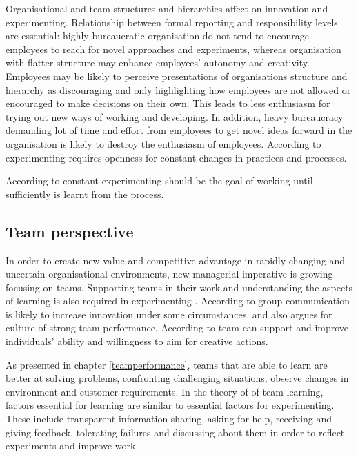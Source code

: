 Organisational and team structures and hierarchies affect on innovation and experimenting. Relationship between formal reporting and responsibility levels are essential: highly bureaucratic organisation do not tend to encourage employees to reach for novel approaches and experiments, whereas organisation with flatter structure may enhance employees' autonomy and creativity. Employees may be likely to perceive presentations of organisations structure and hierarchy as discouraging and only highlighting how employees are not allowed or encouraged to make decisions on their own. This leads to less enthusiasm for trying out new ways of working and developing. In addition, heavy bureaucracy demanding lot of time and effort from employees to get novel ideas forward in the organisation is likely to destroy the enthusiasm of employees. \citep{shalley2004leaders} According to \citet{thomke2003r} experimenting requires openness for constant changes in practices and processes.

According to \citet{amabile2008creativity} constant experimenting should be the goal of working until sufficiently is learnt from the process. 

\subsection{Team perspective}
In order to create new value and competitive advantage in rapidly changing and uncertain organisational environments, new managerial imperative is growing focusing on teams. Supporting teams in their work and understanding the aspects of learning is also required in experimenting \citep{edmondson1999psychological}. According to \citet{monge1992communication} group communication is likely to increase innovation under some circumstances, and also \citet{katzenbach1993wisdom} argues for culture of strong team performance. According to \citet{amabile1996assessing} team can support and improve individuals' ability and willingness to aim for creative actions. 

As presented in chapter \ref{teamperformance}, teams that are able to learn are better at solving problems, confronting challenging situations, observe changes in environment and customer requirements. In the theory of\citet{edmondson1999psychological} of team learning, factors essential for learning are similar to essential factors for experimenting. These include transparent information sharing, asking for help, receiving and giving feedback, tolerating failures and discussing about them in order to reflect experiments and improve work. \citep{edmondson1999psychological}

